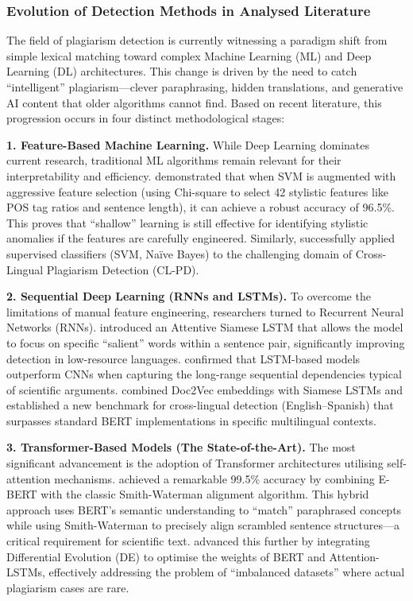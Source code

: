\documentclass[12pt, a4paper]{article}
\begin{document}
\subsubsection{Evolution of Detection Methods in Analysed Literature}

The field of plagiarism detection is currently witnessing a paradigm shift from simple lexical matching toward complex Machine Learning (ML) and Deep Learning (DL) architectures. This change is driven by the need to catch ``intelligent'' plagiarism---clever paraphrasing, hidden translations, and generative AI content that older algorithms cannot find. Based on recent literature, this progression occurs in four distinct methodological stages:

\textbf{1. Feature-Based Machine Learning.} While Deep Learning dominates current research, traditional ML algorithms remain relevant for their interpretability and efficiency. \citet{ElRashidy2024} demonstrated that when SVM is augmented with aggressive feature selection (using Chi-square to select 42 stylistic features like POS tag ratios and sentence length), it can achieve a robust accuracy of 96.5\%. This proves that ``shallow'' learning is still effective for identifying stylistic anomalies if the features are carefully engineered. Similarly, \citet{Zahid2023} successfully applied supervised classifiers (SVM, Na\"ive Bayes) to the challenging domain of Cross-Lingual Plagiarism Detection (CL-PD).

\textbf{2. Sequential Deep Learning (RNNs and LSTMs).} To overcome the limitations of manual feature engineering, researchers turned to Recurrent Neural Networks (RNNs). \citet{Bao2024} introduced an Attentive Siamese LSTM that allows the model to focus on specific ``salient'' words within a sentence pair, significantly improving detection in low-resource languages. \citet{Asalkar2025} confirmed that LSTM-based models outperform CNNs when capturing the long-range sequential dependencies typical of scientific arguments. \citet{Bouaine2023} combined Doc2Vec embeddings with Siamese LSTMs and established a new benchmark for cross-lingual detection (English--Spanish) that surpasses standard BERT implementations in specific multilingual contexts.

\textbf{3. Transformer-Based Models (The State-of-the-Art).} The most significant advancement is the adoption of Transformer architectures utilising self-attention mechanisms. \citet{Antonius2023} achieved a remarkable 99.5\% accuracy by combining E-BERT with the classic Smith-Waterman alignment algorithm. This hybrid approach uses BERT's semantic understanding to ``match'' paraphrased concepts while using Smith-Waterman to precisely align scrambled sentence structures---a critical requirement for scientific text. \citet{Moravvej2023} advanced this further by integrating Differential Evolution (DE) to optimise the weights of BERT and Attention-LSTMs, effectively addressing the problem of ``imbalanced datasets'' where actual plagiarism cases are rare.
\end{document}
